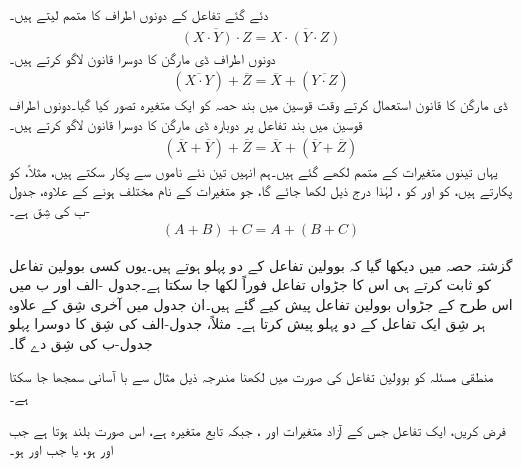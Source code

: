 \quad
دئے گئے تفاعل کے دونوں اطراف کا متمم لیتے ہیں۔
\begin{align*}
\overline{(X\cdot Y)\cdot Z}=\overline{X\cdot(Y\cdot Z)}
\end{align*}
دونوں اطراف ڈی مارگن کا دوسرا قانون لاگو کرتے ہیں۔
\begin{align*}
(\overline{X\cdot Y})+\overline{Z}=\overline{X}+(\overline{Y\cdot Z})
\end{align*}
ڈی مارگن کا قانون استعمال کرتے وقت قوسین میں بند حصہ کو ایک متغیرہ تصور کیا گیا۔دونوں اطراف قوسین میں بند تفاعل پر دوبارہ ڈی مارگن کا دوسرا قانون لاگو کرتے ہیں۔
\begin{align*}
(\overline{X}+\overline{ Y})+\overline{Z}=\overline{X}+(\overline{Y}+\overline{Z})
\end{align*}
یہاں تینوں متغیرات کے متمم لکھے گئے ہیں۔ہم انہیں تین نئے ناموں سے پکار سکتے ہیں، مثلاً، کو  پکارتے ہیں،  کو  اور  کو ، لہٰذا درج ذیل لکھا جائے گا، جو متغیرات کے نام مختلف ہونے کے علاوہ، جدول -ب کی شِق  ہے۔
\begin{align*}
(A+B)+C=A+(B+C)
\end{align*}


گزشتہ حصہ میں دیکھا گیا کہ بوولین تفاعل کے دو پہلو ہوتے ہیں۔یوں کسی بوولین تفاعل کو ثابت کرتے ہی اس کا جڑواں تفاعل فوراً لکھا جا سکتا ہے۔جدول -الف اور ب میں اس طرح کے جڑواں بوولین تفاعل پیش کیے گئے ہیں۔ان جدول میں آخری شِق کے علاوہ ہر شِق ایک تفاعل کے دو پہلو پیش کرتا ہے۔ مثلاً، جدول-الف کی شِق  کا دوسرا پہلو جدول-ب کی شِق  دے گا۔

منطقی مسئلہ کو بوولین تفاعل کی صورت میں لکھنا مندرجہ ذیل مثال سے با آسانی سمجھا جا سکتا ہے۔

فرض کریں، ایک تفاعل جس کے آزاد متغیرات  اور ، جبکہ تابع متغیرہ  ہے، اس صورت بلند ہوتا ہے جب  اور  ہو، یا جب  اور  ہو۔

